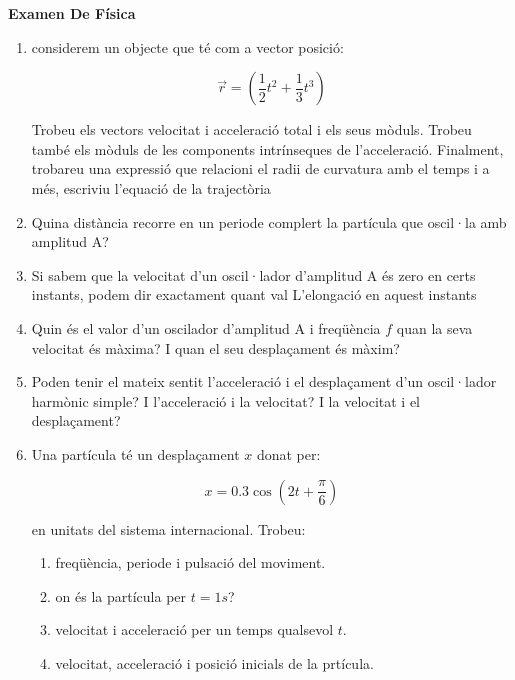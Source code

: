 \documentclass{article}
\begin{document}
\begin{center}
 \textbf{\huge Examen De Física}   
\end{center}

\flushleft
\begin{enumerate}
    \item  considerem un objecte que té com a vector posició:
    
\begin{equation*}
\vec{r}=\left(\frac{1}{2}t^2+\frac{1}{3}t^3\right)
\end{equation*}

Trobeu els vectors velocitat i acceleració total i els seus mòduls. Trobeu també els mòduls de les components intrínseques de l'acceleració. Finalment, trobareu una expressió que relacioni el radii de curvatura amb el temps i a més, escriviu l'equació de la trajectòria
\item  Quina distància recorre en un periode complert la partícula que oscil·la amb amplitud A?
\item Si sabem que la velocitat d'un oscil·lador d'amplitud A és zero en certs instants, podem dir exactament quant val L'elongació en aquest instants
\item Quin és el valor d'un oscilador d'amplitud A i freqüència $f$ quan la seva velocitat és màxima? I quan el seu desplaçament és màxim?
\item Poden tenir el mateix sentit l'acceleració i el desplaçament d'un oscil·lador harmònic simple? I l'acceleració i la velocitat? I la velocitat i el desplaçament?
\item Una partícula té un desplaçament $x$ donat per:

\begin{equation*}
    x=0.3\cos{\left(2t+\frac{\pi}{6}\right)}
\end{equation*}

en unitats del sistema internacional. Trobeu:

\begin{enumerate}
     \item freqüència, periode i pulsació del moviment.
    \item on és la partícula per $t=1s$?
    \item velocitat i acceleració per un temps qualsevol $t$.
    \item velocitat, acceleració i posició inicials de la prtícula.
\end{enumerate}
\end{enumerate}
\end{document}
